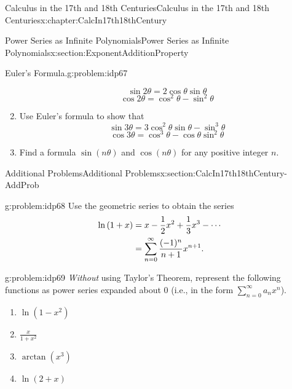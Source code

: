 \begin{chapterptx}{Calculus in the 17th and 18th Centuries}{}{Calculus in the 17th and 18th Centuries}{}{}{x:chapter:CalcIn17th18thCentury}
\begin{sectionptx}{Power Series as Infinite Polynomials}{}{Power Series as Infinite Polynomials}{}{}{x:section:ExponentAdditionProperty}
\begin{problem}{Euler's Formula.}{g:problem:idp67}
\begin{enumerate}[font=\bfseries,label=(\alph*),ref=\alph*]
\begin{equation*}
					\sin 2\theta = 2\cos\theta\sin\theta
				\end{equation*}
				\begin{equation*}
					\cos 2\theta =\cos^2\theta-\sin^2\theta
				\end{equation*}
				\item{}Use Euler's formula to show that%
				\begin{equation*}
					\sin 3\theta = 3\cos^2\theta\sin\theta-\sin^3\theta
				\end{equation*}
				\begin{equation*}
					\cos 3\theta=\cos^3\theta-\cos\theta\sin^2\theta
				\end{equation*}
				\item{}Find a formula \(\sin(n\theta)\) and \(\cos(n\theta)\) for any positive integer \(n\).%
			\end{enumerate}
		\end{problem}
	\end{sectionptx}
	\typeout{************************************************}
	\typeout{************************************************}
	\begin{sectionptx}{Additional Problems}{}{Additional Problems}{}{}{x:section:CalcIn17th18thCentury-AddProb}
		\begin{problem}{}{g:problem:idp68}%
			 Use the geometric series to obtain the series%
			\begin{align*}
				\ln \left(1+x\right)& =x-\frac{1}{2}x^2+\frac{1}{3}x^3-\cdots\\
				& =\sum_{n=0}^\infty\frac{(-1)^n}{n+1}x^{n+1}.{}
			\end{align*}
		\end{problem}
		\begin{problem}{}{g:problem:idp69}%
			 \emph{Without} using Taylor's Theorem, represent the following functions as power series expanded about 0 (i.e., in the form \(\sum_{n=0}^\infty a_nx^n\)).%
			\begin{enumerate}[font=\bfseries,label=(\alph*),ref=\alph*]
				\item{}\(\ln\left(1-x^2\right)\)%
				\item{}\(\frac{x}{1+x^2}\)%
				\item{}\(\arctan \left(x^3\right)\)%
				\item{}\(\ln\left(2+x\right)\)%

\end{enumerate}
\end{problem}
\end{sectionptx}
\end{chapterptx}
